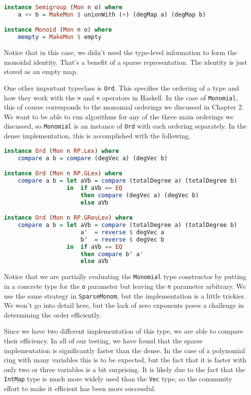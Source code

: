 \documentclass[MS, xcolor=dvipsnames]{wfuthesis}
\theoremstyle{definition}
\begin{document}
\begin{lstlisting}[language=Haskell]
instance Semigroup (Mon n o) where
    a <> b = MakeMon $ unionWith (+) (degMap a) (degMap b)

instance Monoid (Mon n o) where
    mempty = MakeMon $ empty
\end{lstlisting}
Notice that in this case, we didn't need the type-level information to form the monoidal identity. That's a benefit of a sparse representation. The identity is just stored as an empty map. \par 
One other important typeclass is \lstinline{Ord}. This specifies the ordering of a type and how they work with the \lstinline{>} and \lstinline{<} operators in Haskell. In the case of \lstinline{Monomial}, this  of course corresponds to the monomial orderings we discussed in Chapter 2. We want to be able to run algorithms for any of the three main orderings we discussed, so \lstinline{Monomial} is an instance of \lstinline{Ord} with each ordering separately. In the dense implementation, this is accomplished with the following. 
\begin{lstlisting}[language=Haskell]
instance Ord (Mon n RP.Lex) where
    compare a b = compare (degVec a) (degVec b)

instance Ord (Mon n RP.GLex) where
    compare a b = let aVb = compare (totalDegree a) (totalDegree b)
                  in  if aVb == EQ
                      then compare (degVec a) (degVec b)
                      else aVb

instance Ord (Mon n RP.GRevLex) where
    compare a b = let aVb = compare (totalDegree a) (totalDegree b)
                      a'  = reverse $ degVec a
                      b'  = reverse $ degVec b
                  in  if aVb == EQ
                      then compare b' a'
                      else aVb
\end{lstlisting}
Notice that we are partially evaluating the \lstinline{Monomial} type constructor by putting in a concrete type for the \lstinline{o} parameter but leaving the \lstinline{n} parameter arbitrary. We use the same strategy in \lstinline{SparseMonom}, but the implementation is a little trickier. We won't go into detail here, but the lack of zero exponents poses a challenge in determining the order efficiently. \par 
Since we have two different implementation of this type, we are able to compare their efficiency. In all of our testing, we have found that the sparse implementation is significantly faster than the dense. In the case of a polynomial ring with many variables this is to be expected, but the fact that it is faster with only two or three variables is a bit surprising. It is likely due to the fact that the \lstinline{IntMap} type is much more widely used than the \lstinline{Vec} type, so the community effort to make it efficient has been more successful. \par 
\end{document}
